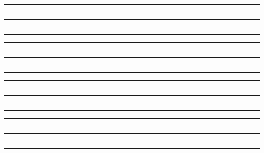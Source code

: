 \documentclass{article}
\begin{document}
\newpage
\noindent{}\rule{1cm}{0.025cm}\framebox{\rule{1cm}{1cm}}

\newpage
\noindent{}\rule{1cm}{0.025cm}

\newpage
\noindent{}\rule{1cm}{0.025cm}

\newpage
\noindent{}\rule{1cm}{0.025cm}

\newpage
\noindent{}\rule{1cm}{0.025cm}

\newpage
\noindent{}\rule{1cm}{0.025cm}

\newpage
\noindent{}\rule{1cm}{0.025cm}

\newpage
\noindent{}\rule{1cm}{0.025cm}

\newpage
\noindent{}\rule{1cm}{0.025cm}

\newpage
\noindent{}\rule{1cm}{0.025cm}

\newpage
\noindent{}\rule{1cm}{0.025cm}

\newpage
\noindent{}\rule{1cm}{0.025cm}

\newpage
\noindent{}\rule{1cm}{0.025cm}

\newpage
\noindent{}\rule{1cm}{0.025cm}

\newpage
\noindent{}\rule{1cm}{0.025cm}

\newpage
\noindent{}\rule{1cm}{0.025cm}

\newpage
\noindent{}\rule{1cm}{0.025cm}

\newpage
\noindent{}\rule{1cm}{0.025cm}

\newpage
\noindent{}\rule{1cm}{0.025cm}

\newpage
\noindent{}\rule{1cm}{0.025cm}
\end{document}
